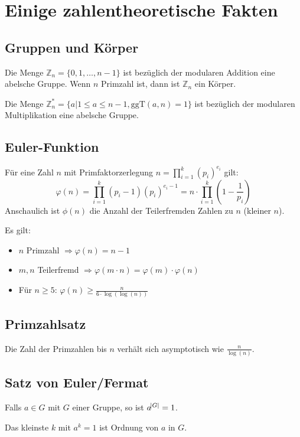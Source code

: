 \chapter{Einige zahlentheoretische Fakten}
\section{Gruppen und Körper}
Die Menge $\mathbb{Z}_n = \{0, 1, \ldots, n-1\}$ ist bezüglich der modularen Addition eine abelsche Gruppe. 
Wenn $n$ Primzahl ist, dann ist $\mathbb{Z}_n$ ein Körper.

Die Menge $\mathbb{Z}_n^* = \{a | 1 \leq a \leq n-1, \text{ggT}(a, n) = 1\}$ ist bezüglich
der modularen Multiplikation eine abelsche Gruppe. 

\section{Euler-Funktion}
Für eine Zahl $n$ mit Primfaktorzerlegung $n= \prod_{i=1}^k {(p_i)}^{e_i}$ gilt:
\begin{equation}
    \varphi(n) = \prod_{i=1}^k (p_i -1 ) {(p_i)}^{e_i-1}
        = n \cdot \prod_{i=1}^k \left(1 - \frac{1}{p_i}\right)
\end{equation}
Anschaulich ist $\phi(n)$ die Anzahl der Teilerfremden Zahlen zu $n$ (kleiner $n$).

Es gilt:
\begin{itemize}
    \item $n$ Primzahl $\Rightarrow \varphi(n) = n-1$
    \item $m, n$ Teilerfremd $\Rightarrow \varphi(m \cdot n) = \varphi(m) \cdot \varphi(n)$
    \item Für $n \geq 5$: $\varphi(n) \geq \frac{n}{6 \cdot \log(\log(n))}$
\end{itemize}

\section{Primzahlsatz}
Die Zahl der Primzahlen bis $n$ verhält sich asymptotisch wie $\frac{n}{\log(n)}$.

\section{Satz von Euler/Fermat}
Falls $a \in G$ mit $G$ einer Gruppe, so ist $a^{\abs{G}} = 1$.

Das kleinste $k$ mit $a^{k} = 1$ ist Ordnung von $a$ in $G$.

